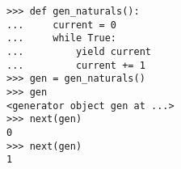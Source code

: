 \begin{lstlisting}
>>> def gen_naturals():
...     current = 0
...     while True:
...         yield current
...         current += 1
>>> gen = gen_naturals()
>>> gen
<generator object gen at ...>
>>> next(gen)
0
>>> next(gen)
1
\end{lstlisting}
